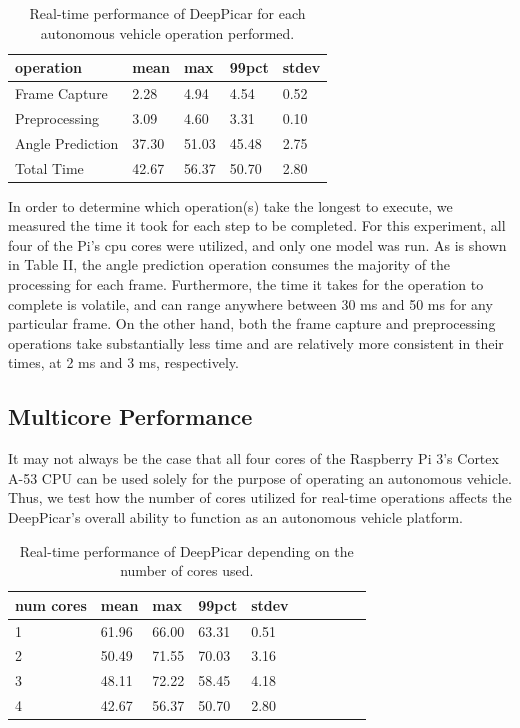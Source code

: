 \begin{table}[h]
  \centering
  \begin{tabular} {| l | l | l | l | l |}
    \hline
    \textbf{operation} & \textbf{mean} & \textbf{max} & \textbf{99pct} & \textbf{stdev} \\ \hline 
    Frame Capture & 2.28 & 4.94 & 4.54  & 0.52\\ \hline
    Preprocessing & 3.09 & 4.60 & 3.31 & 0.10 \\ \hline
    Angle Prediction & 37.30 & 51.03 & 45.48 & 2.75 \\  \hline
    Total Time & 42.67 & 56.37 & 50.70 & 2.80 \\
    \hline
  \end{tabular}
  \caption{Real-time performance of DeepPicar for each autonomous vehicle operation performed.}
\end{table}

In order to determine which operation(s) take the longest to execute, we measured the time it 
took for each step to be completed. For this experiment, all four of the Pi's cpu cores were utilized, 
and only one model was run. As is shown in Table II, the angle prediction operation consumes the 
majority of the processing for each frame. Furthermore, the time it takes for the operation to 
complete is volatile, and can range anywhere between 30 ms and 50 ms for any particular frame. On the 
other hand, both the frame capture and preprocessing operations take substantially less time 
and are relatively more consistent in their times, at 2 ms and 3 ms, respectively. 

\subsection{Multicore Performance}
It may not always be the case that all four cores of the Raspberry Pi 3's Cortex A-53 CPU can be used 
solely for the purpose of operating an autonomous vehicle. Thus, we test how the number of cores 
utilized for real-time operations affects the DeepPicar's overall ability to function as an autonomous 
vehicle platform.

\begin{table}[h]
  \centering
  \begin{tabular} {| l | l | l | l | l | l | l | l | l | l |}
    \hline
    \textbf{num cores} & \textbf{mean} & \textbf{max} & \textbf{99pct} & \textbf{stdev} \\ \hline 
    1 & 61.96 & 66.00 & 63.31 & 0.51\\ \hline
    2 & 50.49 & 71.55 & 70.03 & 3.16 \\ \hline
    3 & 48.11 & 72.22 & 58.45 & 4.18 \\ \hline
    4 & 42.67 & 56.37 & 50.70 & 2.80 \\
    \hline
  \end{tabular}
  \caption{Real-time performance of DeepPicar depending on the number of cores used.}
\end{table}

